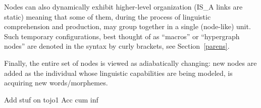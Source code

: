 \documentclass[11pt,bookmarks,bookmarksnumbered,naturalnames,plainpages=false,pdftex,colorlinks=true,urlcolor=blue,bookmarksdepth=subsection,plainpages=false]{paper}
\begin{document}
Nodes can also dynamically exhibit higher-level organization (IS\_A links are
static) meaning that some of them, during the process of linguistic
comprehension and production, may group together in a single (node-like)
unit. Such temporary configurations, best thought of as ``macros'' or
``hypergraph nodes'' are denoted in the syntax by curly brackets, see
Section~\ref{parens}.

Finally, the entire set of nodes is viewed as adiabatically changing: new
nodes are added as the individual whose linguistic capabilities are being
modeled, is acquiring new words/morphemes. 



Add stuf on tojo1
Acc cum inf


\printbibliography
\end{document}
